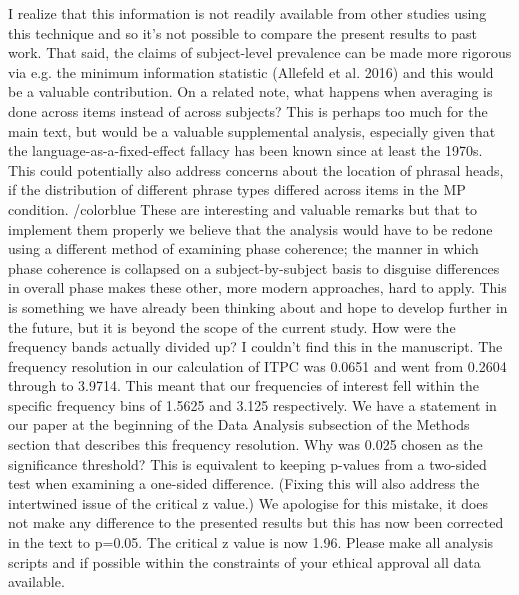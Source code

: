 \documentclass[10pt,letterpaper]{article}
\begin{document}
\color{black}
\newline
\noindent
I realize that this information is not readily available from other studies using this technique and so it's not possible to compare the present results to past work. That said, the claims of subject-level prevalence can be made more rigorous via e.g. the minimum information statistic (Allefeld et al. 2016) and this would be a valuable contribution. 
On a related note, what happens when averaging is done across items instead of across subjects? This is perhaps too much for the main text, but would be a valuable supplemental analysis, especially given that the language-as-a-fixed-effect fallacy has been known since at least the 1970s. This could potentially also address concerns about the location of phrasal heads, if the distribution of different phrase types differed across items in the MP condition. 
/color{blue}
These are interesting and valuable remarks but that to implement them properly we believe that the analysis would have to be redone using a different method of examining phase coherence; the manner in which phase coherence is collapsed on a subject-by-subject basis to disguise differences in overall phase makes these other, more modern approaches, hard to apply. This is something we have already been thinking about and hope to develop further in the future, but it is beyond the scope of the current study.
\color{black}
\newline
\noindent
How were the frequency bands actually divided up? I couldn't find this in the manuscript. 
\color{blue}
The frequency resolution in our calculation of ITPC was 0.0651 and went from 0.2604 through to 3.9714. This meant that our frequencies of interest fell within the specific frequency bins of 1.5625 and 3.125 respectively. We have a statement in our paper at the beginning of the Data Analysis subsection of the Methods section that describes this frequency resolution.
\color{black}
\newline
\noindent
Why was 0.025 chosen as the significance threshold? This is equivalent to keeping p-values from a two-sided test when examining a one-sided difference. (Fixing this will also address the intertwined issue of the critical z value.) 
\color{blue} We apologise for this mistake, it does not make any difference to the presented results but this has now been corrected in the text to p=0.05. The critical z value is now 1.96.
\newline
\noindent
Please make all analysis scripts and if possible within the constraints of your ethical approval all data available.
\end{document}
